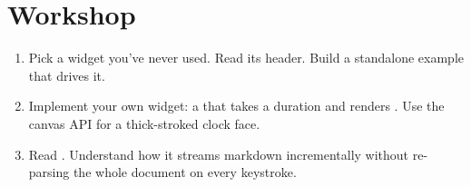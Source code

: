 \section*{Workshop}

\begin{enumerate}[leftmargin=*]
  \item Pick a widget you've never used. Read its header. Build a
    standalone example that drives it.
  \item Implement your own widget: a  that takes a
    duration and renders . Use the canvas API for
    a thick-stroked clock face.
  \item Read .
    Understand how it streams markdown incrementally without
    re-parsing the whole document on every keystroke.
\end{enumerate}
